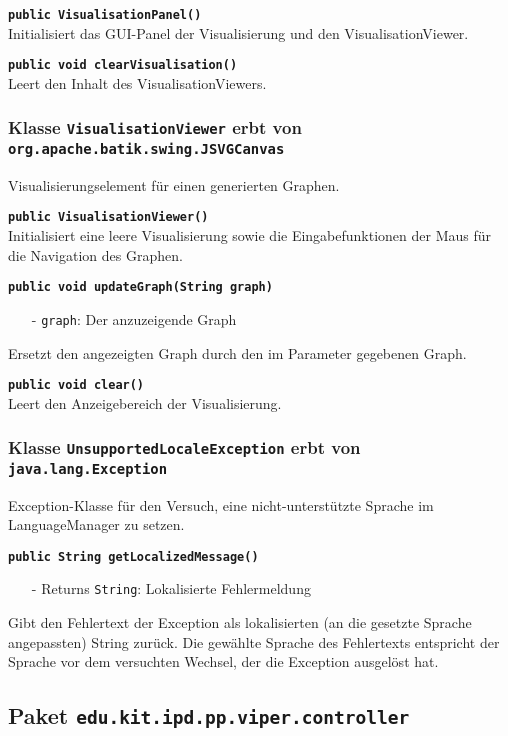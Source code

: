 \documentclass[parskip=full,11pt,twoside]{scrartcl}
\begin{document}
\textbf{\texttt{public VisualisationPanel()}}\\
Initialisiert das GUI-Panel der Visualisierung und den VisualisationViewer.

\textbf{\texttt{public void clearVisualisation()}}\\
Leert den Inhalt des VisualisationViewers.

\subsubsection{Klasse \texttt{VisualisationViewer} erbt von \texttt{org.apache.batik.swing.JSVGCanvas}}

Visualisierungselement für einen generierten Graphen.

\textbf{\texttt{public VisualisationViewer()}}\\
Initialisiert eine leere Visualisierung sowie die Eingabefunktionen der Maus für die Navigation des Graphen.

\textbf{\texttt{public void updateGraph(String graph)}}
\begin{itemize}[noitemsep]
	\item[-] \texttt{graph}: Der anzuzeigende Graph
\end{itemize}
Ersetzt den angezeigten Graph durch den im Parameter gegebenen Graph.

\textbf{\texttt{public void clear()}}\\
Leert den Anzeigebereich der Visualisierung.

\subsubsection{Klasse \texttt{UnsupportedLocaleException} erbt von \texttt{java.lang.Exception}}
Exception-Klasse für den Versuch, eine nicht-unterstützte Sprache im LanguageManager zu setzen.

\textbf{\texttt{public String getLocalizedMessage()}}
\begin{itemize}[noitemsep]
	\item[-] Returns \texttt{String}: Lokalisierte Fehlermeldung
\end{itemize}
Gibt den Fehlertext der Exception als lokalisierten (an die gesetzte Sprache angepassten) String zurück. Die gewählte Sprache des Fehlertexts entspricht der Sprache vor dem versuchten Wechsel, der die Exception ausgelöst hat.

\subsection{Paket \texttt{edu.kit.ipd.pp.viper.controller}}
\end{document}
